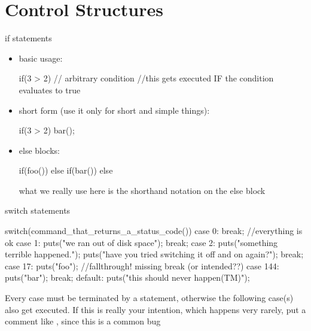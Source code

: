 \documentclass[10pt,graphics,aspectratio=169,table]{beamer}
\begin{document}
\section{Control Structures}
\begin{frame}[fragile]{if statements}
    \begin{itemize}
    \item basic usage:
        \begin{codeblock}
if(3 > 2){  // arbitrary condition
    //this gets executed IF the condition evaluates to true
}
        \end{codeblock}
    \item short form (use it only for short and simple things):
        \begin{codeblock}
if(3 > 2) bar();
        \end{codeblock}

    \item else blocks:
        \begin{codeblock}
if(foo()){
}
else if(bar()){
}
else{
}
        \end{codeblock}

        what we really use here is the shorthand notation on the else block

    \end{itemize}
\end{frame}

\begin{frame}[fragile]{switch statements}
    \begin{codeblock}
switch(command_that_returns_a_status_code()){
    case 0: break; //everything is ok
    case 1: puts("we ran out of disk space"); break;
    case 2: {
        puts("something terrible happened.");
        puts("have you tried switching it off and on again?");
    }break;
    case 17: puts("foo"); //fallthrough! missing break (or intended??)
    case 144: puts("bar"); break;
    default: puts("this should never happen(TM)");
}
    \end{codeblock}
    Every case must be terminated by a  statement, otherwise the
    following case(s) also get executed. If this is really your intention,
    which happens very rarely, put a comment like ,
    since this is a common bug
\end{frame}
\end{document}
